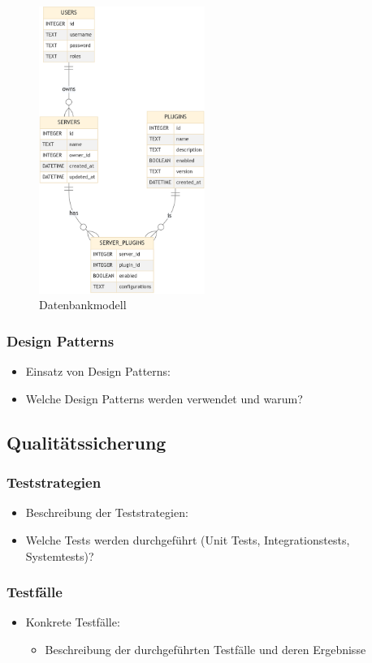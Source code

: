   \begin{figure}
    \centering
    \includegraphics[width=0.48\textwidth]{images/database-diagram-2024-05-27.png}
    \caption{Datenbankmodell}\label{fig:datenbankmodell}
  \end{figure}

\subsubsection{Design Patterns}\label{design-patterns}

\begin{itemize}
  \item
        Einsatz von Design Patterns:
  \item
        Welche Design Patterns werden verwendet und warum?
\end{itemize}

\subsection{Qualitätssicherung}\label{qualituxe4tssicherung}

\subsubsection{Teststrategien}\label{teststrategien}

\begin{itemize}
  \item
        Beschreibung der Teststrategien:
  \item
        Welche Tests werden durchgeführt (Unit Tests, Integrationstests, Systemtests)?
\end{itemize}

\subsubsection{Testfälle}\label{testfuxe4lle}

\begin{itemize}
  \item
        Konkrete Testfälle:

        \begin{itemize}

          \item
                Beschreibung der durchgeführten Testfälle und deren Ergebnisse
        \end{itemize}
\end{itemize}